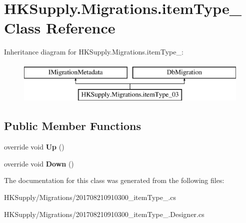 \hypertarget{class_h_k_supply_1_1_migrations_1_1item_type__03}{}\section{H\+K\+Supply.\+Migrations.\+item\+Type\+\_ Class Reference}
\label{class_h_k_supply_1_1_migrations_1_1item_type__03}
Inheritance diagram for H\+K\+Supply.\+Migrations.\+item\+Type\+\_\+:\begin{figure}[H]
\begin{center}
\leavevmode
\includegraphics[height=2.000000cm]{class_h_k_supply_1_1_migrations_1_1item_type__03}
\end{center}
\end{figure}
\subsection*{Public Member Functions}
\begin{DoxyCompactItemize}
\item 
\mbox{\label{class_h_k_supply_1_1_migrations_1_1item_type__03_ac4adc0bfae1694f136ff977ca9998f63}} 
override void {\bfseries Up} ()
\item 
\mbox{\label{class_h_k_supply_1_1_migrations_1_1item_type__03_ae241bade54927f4bf3a2d1955d6a09fc}} 
override void {\bfseries Down} ()
\end{DoxyCompactItemize}


The documentation for this class was generated from the following files\+:\begin{DoxyCompactItemize}
\item 
H\+K\+Supply/\+Migrations/201708210910300\+\_\+item\+Type\+\_.\+cs\item 
H\+K\+Supply/\+Migrations/201708210910300\+\_\+item\+Type\+\_.\+Designer.\+cs\end{DoxyCompactItemize}
